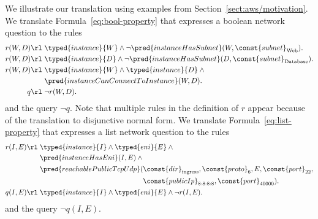 We illustrate our translation using examples from Section~\ref{sect:aws/motivation}. We translate Formula~\ref{eq:bool-property} that expresses a boolean network question to the \Datalog rules
\begin{align*}
r(W,D)\rl\;& \typed{instance}{W}\wedge\neg\pred{instanceHasSubnet}(W,\const{subnet}_\text{Web}).\\
r(W,D)\rl\;& \typed{instance}{D}\wedge\neg\pred{instanceHasSubnet}(D,\const{subnet}_\text{Database}).\\
r(W,D)\rl\;& \typed{instance}{W}\wedge\typed{instance}{D}\:\wedge\:\\
           & \pred{instanceCanConnectToInstance}(W,D).\\
q\rl\;& \neg r(W,D).
\end{align*}
and the \Datalog query $\neg q$. Note that multiple rules in the definition of $r$ appear because of the translation to disjunctive normal form. We translate Formula~\ref{eq:list-property} that expresses a list network question to the \Datalog rules
\begin{align*}
r(I,E)\rl\;& \typed{instance}{I}\wedge\typed{eni}{E}\:\wedge\:\\
           & \pred{instanceHasEni}(I,E)\:\wedge\:\\
           &\begin{aligned}
               \pred{reachablePublicTcpUdp}(&\const{dir}_\text{ingress},\const{proto}_6,E,\const{port}_{22},\\
                                            &\const{publicIp}_\text{8:8:8:8},\const{port}_\text{40000}).
             \end{aligned}\\
q(I,E)\rl\;& \typed{instance}{I}\wedge\typed{eni}{E}\wedge\neg r(I,E).
\end{align*}
and the \Datalog query $\neg q(I,E)$.

